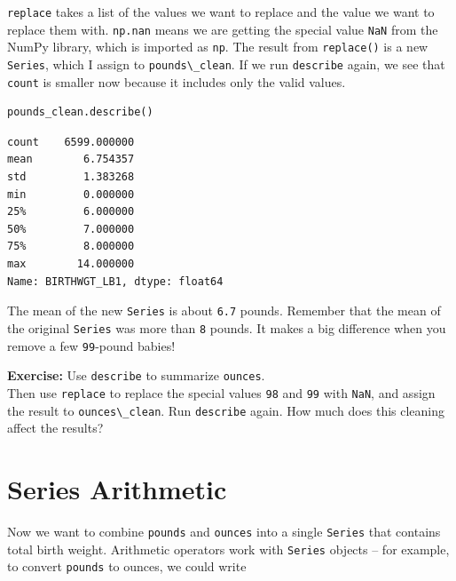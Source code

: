 \passthrough{\lstinline!replace!} takes a list of the values we want to
replace and the value we want to replace them with.
\passthrough{\lstinline!np.nan!} means we are getting the special value
\passthrough{\lstinline!NaN!} from the NumPy library, which is imported
as \passthrough{\lstinline!np!}. The result from
\passthrough{\lstinline!replace()!} is a new
\passthrough{\lstinline!Series!}, which I assign to
\passthrough{\lstinline!pounds\_clean!}. If we run
\passthrough{\lstinline!describe!} again, we see that
\passthrough{\lstinline!count!} is smaller now because it includes only
the valid values.

\begin{lstlisting}[language=Python,style=source]
pounds_clean.describe()
\end{lstlisting}

\begin{lstlisting}[style=output]
count    6599.000000
mean        6.754357
std         1.383268
min         0.000000
25%         6.000000
50%         7.000000
75%         8.000000
max        14.000000
Name: BIRTHWGT_LB1, dtype: float64
\end{lstlisting}

The mean of the new \passthrough{\lstinline!Series!} is about
\passthrough{\lstinline!6.7!} pounds. Remember that the mean of the
original \passthrough{\lstinline!Series!} was more than
\passthrough{\lstinline!8!} pounds. It makes a big difference when you
remove a few \passthrough{\lstinline!99!}-pound babies!

\textbf{Exercise:} Use \passthrough{\lstinline!describe!} to summarize
\passthrough{\lstinline!ounces!}.\\
Then use \passthrough{\lstinline!replace!} to replace the special values
\passthrough{\lstinline!98!} and \passthrough{\lstinline!99!} with
\passthrough{\lstinline!NaN!}, and assign the result to
\passthrough{\lstinline!ounces\_clean!}. Run
\passthrough{\lstinline!describe!} again. How much does this cleaning
affect the results?

\hypertarget{series-arithmetic}{%
\section{Series Arithmetic}\label{series-arithmetic}}

Now we want to combine \passthrough{\lstinline!pounds!} and
\passthrough{\lstinline!ounces!} into a single
\passthrough{\lstinline!Series!} that contains total birth weight.
Arithmetic operators work with \passthrough{\lstinline!Series!} objects
-- for example, to convert \passthrough{\lstinline!pounds!} to ounces,
we could write

